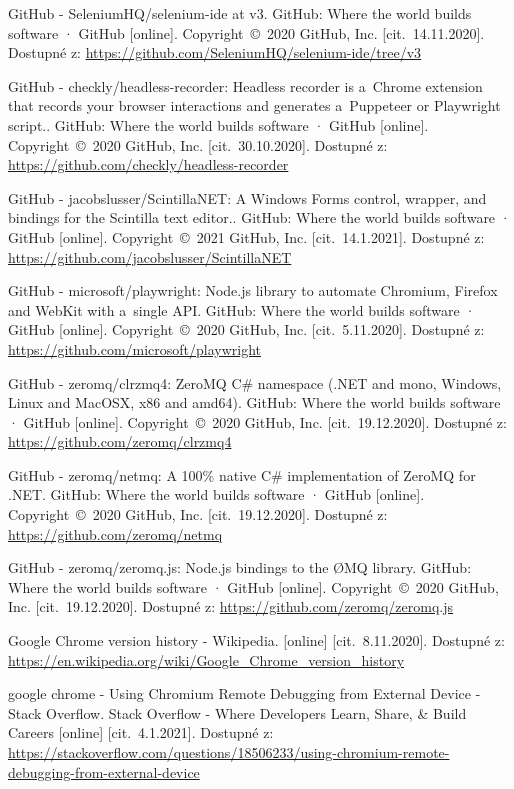 \begin{thebibliography}{99}
 GitHub - SeleniumHQ/selenium-ide at v3. GitHub: Where the world builds software · GitHub [online]. Copyright~©~2020 GitHub, Inc. [cit.~14.11.2020]. Dostupné z: \url{https://github.com/SeleniumHQ/selenium-ide/tree/v3}

 GitHub - checkly/headless-recorder: Headless recorder is a~Chrome extension that records your browser interactions and generates a~Puppeteer or Playwright script.. GitHub: Where the world builds software · GitHub [online]. Copyright~©~2020 GitHub, Inc. [cit.~30.10.2020]. Dostupné z: \url{https://github.com/checkly/headless-recorder}

 GitHub - jacobslusser/ScintillaNET: A Windows Forms control, wrapper, and bindings for the Scintilla text editor.. GitHub: Where the world builds software · GitHub [online]. Copyright~©~2021 GitHub, Inc. [cit.~14.1.2021]. Dostupné z: \url{https://github.com/jacobslusser/ScintillaNET}

 GitHub - microsoft/playwright: Node.js library to automate Chromium, Firefox and WebKit with a~single API. GitHub: Where the world builds software · GitHub [online]. Copyright~©~2020 GitHub, Inc. [cit.~5.11.2020]. Dostupné z: \url{https://github.com/microsoft/playwright}

 GitHub - zeromq/clrzmq4: ZeroMQ C\# namespace (.NET and mono, Windows, Linux and MacOSX, x86 and amd64). GitHub: Where the world builds software · GitHub [online]. Copyright~©~2020 GitHub, Inc. [cit.~19.12.2020]. Dostupné z: \url{https://github.com/zeromq/clrzmq4}

 GitHub - zeromq/netmq: A 100\% native C\# implementation of ZeroMQ for .NET. GitHub: Where the world builds software · GitHub [online]. Copyright~©~2020 GitHub, Inc. [cit.~19.12.2020]. Dostupné z: \url{https://github.com/zeromq/netmq}

 GitHub - zeromq/zeromq.js: Node.js bindings to the ØMQ library. GitHub: Where the world builds software · GitHub [online]. Copyright~©~2020 GitHub, Inc. [cit.~19.12.2020]. Dostupné z: \url{https://github.com/zeromq/zeromq.js}

 Google Chrome version history - Wikipedia. [online] [cit.~8.11.2020]. Dostupné z: \url{https://en.wikipedia.org/wiki/Google_Chrome_version_history}

 google chrome - Using Chromium Remote Debugging from External Device - Stack Overflow. Stack Overflow - Where Developers Learn, Share, \& Build Careers [online] [cit.~4.1.2021]. Dostupné z: \url{https://stackoverflow.com/questions/18506233/using-chromium-remote-debugging-from-external-device}


\end{thebibliography}
